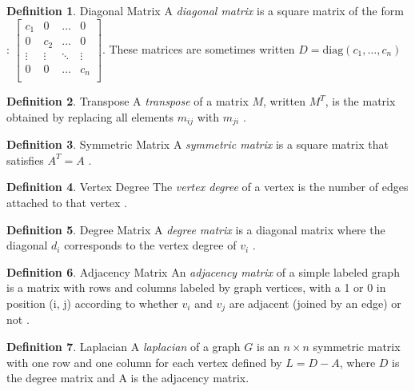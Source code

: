 \documentclass[11pt]{article}
\theoremstyle{definition}
\newtheorem{definition}{Definition}[section]
\begin{document}
	\theoremstyle{definition}
	\begin{definition}{Diagonal Matrix}
		A \emph{diagonal matrix} is a square matrix of the form \cite{mathworld:DiagonalMatrix}:
		$\begin{bmatrix}
			c_1 & 0 & \dots & 0 \\
			0 & c_2 & \dots & 0 \\
			\vdots & \vdots  & \ddots  & \vdots \\
			0 & 0 & \dots & c_n \\
		\end{bmatrix}$. These matrices are sometimes written $D = \text{diag}(c_1, \dots, c_n)$
	\end{definition}
	
	\theoremstyle{definition}
	\begin{definition}{Transpose}
		A \emph{transpose} of a matrix $M$, written $M^T$, is the matrix obtained by replacing all elements $m_{ij}$ with $m_{ji}$ \cite{mathworld:Transpose}.
	\end{definition}
	
	\theoremstyle{definition}
	\begin{definition}{Symmetric Matrix}
		A \emph{symmetric matrix} is a square matrix that satisfies $A^T = A$ \cite{mathworld:SymmetricMatrix}.
	\end{definition}
	
	\theoremstyle{definition}
	\begin{definition}{Vertex Degree}
		The \emph{vertex degree} of a vertex is the number of edges attached to that vertex \cite{mathworld:VertexDegree}.
	\end{definition}
	
	\theoremstyle{definition}
	\begin{definition}{Degree Matrix}
		A \emph{degree matrix} is a diagonal matrix where the diagonal $d_i$ corresponds to the vertex degree of $v_i$ \cite{mathworld:DegreeMatrix}. 
	\end{definition}
	
	\theoremstyle{definition}
	\begin{definition}{Adjacency Matrix}
		An \emph{adjacency matrix} of a simple labeled graph is a matrix with rows and columns labeled by graph vertices, with a 1 or 0 in position (i, j) according to whether $v_i$ and $v_j$ are adjacent (joined by an edge) or not \cite{mathworld:AdjacencyMatrix}. 
	\end{definition}
	
	\theoremstyle{definition}
	\begin{definition}{Laplacian}
		A \emph{laplacian} of a graph $G$ is an $n \times n$ symmetric matrix with one row and one column for each vertex defined by $L = D - A$, where $D$ is the degree matrix and A is the adjacency matrix.
	\end{definition}
	
\end{document}
